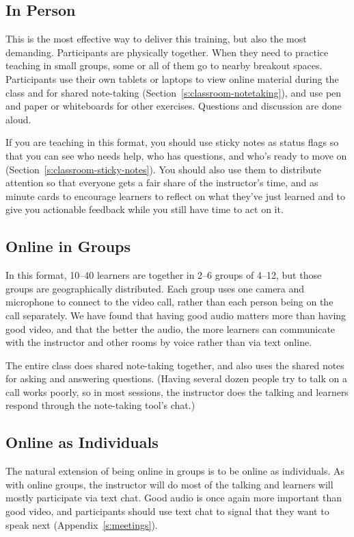\subsection*{In Person}

This is the most effective way to deliver this training,
but also the most demanding.
Participants are physically together. When they need to
practice teaching in small groups, some or all of them go to nearby
breakout spaces. Participants use their own tablets or laptops to view
online material during the class and for shared note-taking
(Section~\ref{s:classroom-notetaking}), and use pen and paper or
whiteboards for other exercises. Questions and discussion are done
aloud.

If you are teaching in this format, you should use sticky notes as
status flags so that you can see who needs help, who has questions,
and who's ready to move on (Section~\ref{s:classroom-sticky-notes}). You
should also use them to distribute attention so that everyone gets a
fair share of the instructor's time, and as minute cards to encourage
learners to reflect on what they've just learned and to give you
actionable feedback while you still have time to act on it.

\subsection*{Online in Groups}

In this format, 10--40 learners are together in 2--6 groups of 4--12, but
those groups are geographically distributed. Each group uses one camera
and microphone to connect to the video call, rather than each person
being on the call separately. We have found that having good audio
matters more than having good video, and that the better the audio, the
more learners can communicate with the instructor and other rooms by
voice rather than via text online.

The entire class does shared note-taking together, and also uses the
shared notes for asking and answering questions. (Having several dozen
people try to talk on a call works poorly, so in most sessions, the
instructor does the talking and learners respond through the note-taking
tool's chat.)

\subsection*{Online as Individuals}

The natural extension of being online in groups is to be online as
individuals. As with online groups, the instructor will do most of the
talking and learners will mostly participate via text chat. Good audio
is once again more important than good video, and participants should
use text chat to signal that they want to speak next
(Appendix~\ref{s:meetings}).

